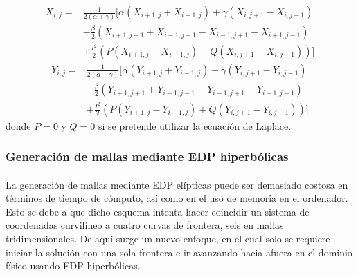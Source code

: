 \documentclass[letterpaper, openright, 12pt]{book}
\begin{document}
        \begin{align}
            X_{i, j} =& \frac{1}{2 \left(\alpha + \gamma\right)}
            \Biggl[
                \alpha \left(X_{i+1, j} + X_{i-1, j}\right)
                + \gamma \left(X_{i, j+1} - X_{i, j-1}\right)\\
                &- \frac{\beta}{2} \left(X_{i+1, j+1} + X_{i-1, j-1}
                        - X_{i-1, j+1} - X_{i+1, j-1}\right)\\
                &+ \frac{I^2}{2} \left( P \left(X_{i+1, j} - X_{i-1, j}\right)
                + Q \left( X_{i, j+1} - X_{i, j-1} \right)\right)
            \Biggr]
        \end{align}
        \begin{align}
            Y_{i, j} =& \frac{1}{2 \left(\alpha + \gamma\right)}
            \Biggl[
                \alpha \left(Y_{i+1, j} + Y_{i-1, j}\right)
                + \gamma \left(Y_{i, j+1} - Y_{i, j-1}\right)\\
                &- \frac{\beta}{2} \left(Y_{i+1, j+1} + Y_{i-1, j-1}
                        - Y_{i-1, j+1} - Y_{i+1, j-1}\right)\\
                &+ \frac{I^2}{2} \left( P \left(Y_{i+1, j} - Y_{i-1, j}\right)
                + Q \left( Y_{i, j+1} - Y_{i, j-1} \right)\right)
            \Biggr]
        \end{align}
        donde $P=0$ y $Q=0$ si se pretende utilizar la ecuación de Laplace.


    \subsubsection{Generación de mallas mediante EDP hiperbólicas}
    \paragraph*{}
        La generación de mallas mediante EDP elípticas puede ser demasiado
        costosa en términos de tiempo de cómputo, así como en el uso de memoria
        en el ordenador. Esto se debe a que dicho esquema intenta hacer
        coincidir un sistema de coordenadas curvilíneo a cuatro curvas de
        frontera, seis en mallas tridimensionales. De aquí surge un nuevo
        enfoque, en el cual solo se requiere iniciar la solución con una sola
        frontera e ir avanzando hacia afuera en el dominio físico usando EDP
        hiperbólicas. \cite{farrashkhalvat}
\end{document}
